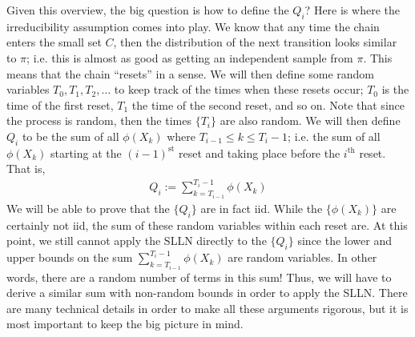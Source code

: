 \documentclass[12pt]{article}
\begin{document}
Given this overview, the big question is how to define the $Q_i$? Here is where the irreducibility assumption comes into play. We know that any time the chain enters the small set $C$, then the 
distribution of the next transition looks similar to $\pi$; i.e. this is almost as good as getting an independent sample from $\pi$. This means that the chain ``resets'' in a sense. We will then define 
some random variables $T_0, T_1, T_2, \dots$ to keep track of the times when these resets occur; $T_0$ is the time of the first reset, $T_1$ the time of the second reset, and so on. Note that 
since the process is random, then the times $\{T_i\}$ are also random. We will then define $Q_i$ to be the sum of all $\phi(X_k)$ where $T_{i - 1} \leq k \leq T_i - 1$; i.e. the sum of all 
$\phi(X_k)$ starting at the $(i-1)^{\text{st}}$ reset and taking place before the $i^{\text{th}}$ reset. That is, 
\begin{align*}
Q_i := \sum_{k = T_{i-1}}^{T_i - 1} \phi(X_k)
\end{align*}
We will be able to prove that the $\{Q_i\}$ are in fact iid. While the $\{\phi(X_k)\}$ are certainly not iid, the sum of these random variables within each reset are. At this point, we still 
cannot apply the SLLN directly to the $\{Q_i\}$ since the lower and upper bounds on the sum $ \sum_{k = T_{i-1}}^{T_i - 1} \phi(X_k)$ are random variables. In other words, there are a random 
number of terms in this sum! Thus, we will have to derive a similar sum with non-random bounds in order to apply the SLLN. There are many technical details in order to make all these arguments 
rigorous, but it is most important to keep the big picture in mind. 
\end{document}
